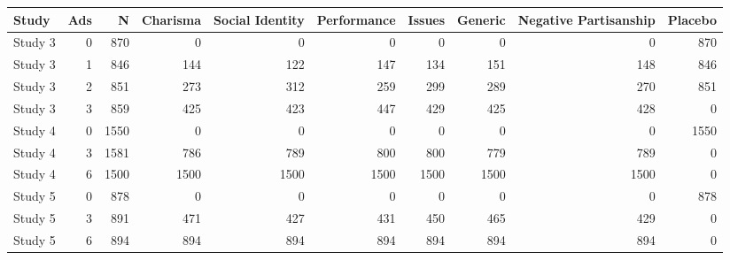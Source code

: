 
\begin{tabular}{lrrrrrrrrr}
\toprule
Study & Ads & N & Charisma & Social Identity & Performance & Issues & Generic & Negative Partisanship & Placebo\\
\midrule
Study 3 & 0 & 870 & 0 & 0 & 0 & 0 & 0 & 0 & 870\\
Study 3 & 1 & 846 & 144 & 122 & 147 & 134 & 151 & 148 & 846\\
Study 3 & 2 & 851 & 273 & 312 & 259 & 299 & 289 & 270 & 851\\
Study 3 & 3 & 859 & 425 & 423 & 447 & 429 & 425 & 428 & 0\\
Study 4 & 0 & 1550 & 0 & 0 & 0 & 0 & 0 & 0 & 1550\\
\addlinespace
Study 4 & 3 & 1581 & 786 & 789 & 800 & 800 & 779 & 789 & 0\\
Study 4 & 6 & 1500 & 1500 & 1500 & 1500 & 1500 & 1500 & 1500 & 0\\
Study 5 & 0 & 878 & 0 & 0 & 0 & 0 & 0 & 0 & 878\\
Study 5 & 3 & 891 & 471 & 427 & 431 & 450 & 465 & 429 & 0\\
Study 5 & 6 & 894 & 894 & 894 & 894 & 894 & 894 & 894 & 0\\
\bottomrule
\end{tabular}
